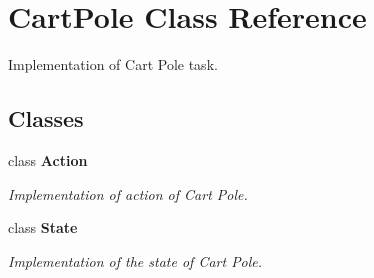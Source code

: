 \section{Cart\+Pole Class Reference}
\label{classmlpack_1_1rl_1_1CartPole}


Implementation of Cart Pole task.  


\subsection*{Classes}
\begin{DoxyCompactItemize}
\item 
class \textbf{ Action}
\begin{DoxyCompactList}\small\item\em Implementation of action of Cart Pole. \end{DoxyCompactList}\item 
class \textbf{ State}
\begin{DoxyCompactList}\small\item\em Implementation of the state of Cart Pole. \end{DoxyCompactList}\end{DoxyCompactItemize}
